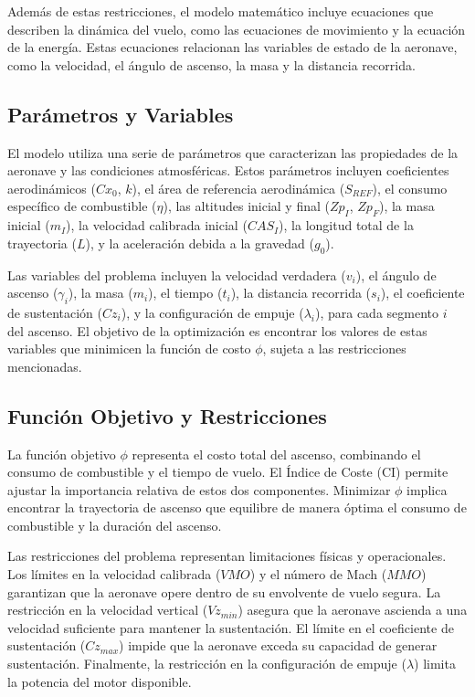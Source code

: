 \documentclass[fleqn]{article}
\begin{document}
Además de estas restricciones, el modelo matemático incluye ecuaciones que describen la dinámica del vuelo, como las ecuaciones de movimiento y la ecuación de la energía. Estas ecuaciones relacionan las variables de estado de la aeronave, como la velocidad, el ángulo de ascenso, la masa y la distancia recorrida.

\subsection{Parámetros y Variables}

El modelo utiliza una serie de parámetros que caracterizan las propiedades de la aeronave y las condiciones atmosféricas. Estos parámetros incluyen coeficientes aerodinámicos ($Cx_0$, $k$), el área de referencia aerodinámica ($S_{REF}$), el consumo específico de combustible ($\eta$), las altitudes inicial y final ($Zp_I$, $Zp_F$), la masa inicial ($m_I$), la velocidad calibrada inicial ($CAS_I$), la longitud total de la trayectoria ($L$), y la aceleración debida a la gravedad ($g_0$).

Las variables del problema incluyen la velocidad verdadera ($v_i$), el ángulo de ascenso ($\gamma_i$), la masa ($m_i$), el tiempo ($t_i$), la distancia recorrida ($s_i$), el coeficiente de sustentación ($Cz_i$), y la configuración de empuje ($\lambda_i$), para cada segmento $i$ del ascenso.  El objetivo de la optimización es encontrar los valores de estas variables que minimicen la función de costo $\phi$, sujeta a las restricciones mencionadas.

\subsection{Función Objetivo y Restricciones}

La función objetivo $\phi$ representa el costo total del ascenso, combinando el consumo de combustible y el tiempo de vuelo.  El Índice de Coste (CI) permite ajustar la importancia relativa de estos dos componentes.  Minimizar $\phi$ implica encontrar la trayectoria de ascenso que equilibre de manera óptima el consumo de combustible y la duración del ascenso.

Las restricciones del problema representan limitaciones físicas y operacionales. Los límites en la velocidad calibrada ($VMO$) y el número de Mach ($MMO$) garantizan que la aeronave opere dentro de su envolvente de vuelo segura. La restricción en la velocidad vertical ($Vz_{min}$) asegura que la aeronave ascienda a una velocidad suficiente para mantener la sustentación.  El límite en el coeficiente de sustentación ($Cz_{max}$)  impide que la aeronave exceda su capacidad de generar sustentación. Finalmente, la restricción en la configuración de empuje ($\lambda$) limita la potencia del motor disponible.
\end{document}
